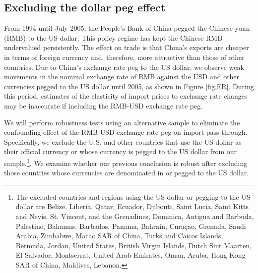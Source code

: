 \subsection{Excluding the dollar peg effect}

From 1994 until July 2005, the People's Bank of China pegged the Chinese yuan (RMB) to the US dollar. This policy regime has kept the Chinese RMB undervalued persistently. The effect on trade is that China's exports are cheaper in terms of foreign currency and, therefore, more attractive than those of other countries. Due to China's exchange rate peg to the US dollar, we observe weak movements in the nominal exchange rate of RMB against the USD and other currencies pegged to the US dollar until 2005, as shown in Figure \ref{fig.ER}. During this period, estimates of the elasticity of import prices to exchange rate changes may be inaccurate if including the RMB-USD exchange rate peg.

We will perform robustness tests using an alternative sample to eliminate the confounding effect of the RMB-USD exchange rate peg on import pass-through. Specifically, we exclude the U.S. and other countries that use the US dollar as their official currency or whose currency is pegged to the US dollar from our sample.\footnote{The excluded countries and regions using the US dollar or pegging to the US dollar are Belize, Liberia, Qatar, Ecuador, Djibouti, Saint Lucia, Saint Kitts and Nevis, St. Vincent, and the Grenadines, Dominica, Antigua and Barbuda, Palestine, Bahamas, Barbados, Panama, Bahrain, Curaçao, Grenada, Saudi Arabia, Zimbabwe, Macao SAR of China, Turks and Caicos Islands, Bermuda, Jordan, United States, British Virgin Islands, Dutch Sint Maarten, El Salvador, Montserrat, United Arab Emirates, Oman, Aruba, Hong Kong SAR of China, Maldives, Lebanon.}. We examine whether our previous conclusion is robust after excluding those countries whose currencies are denominated in or pegged to the US dollar.


